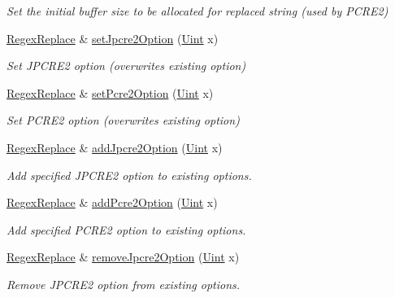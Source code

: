 \begin{DoxyCompactItemize}
\begin{DoxyCompactList}\small\item\em Set the initial buffer size to be allocated for replaced string (used by P\+C\+R\+E2) \end{DoxyCompactList}\item 
\hyperlink{classjpcre2_1_1RegexReplace}{Regex\+Replace} \& \hyperlink{classjpcre2_1_1RegexReplace_a745ab0b979035214a83ed0a04686ef6a}{set\+Jpcre2\+Option} (\hyperlink{namespacejpcre2_a078242d38221a13fb3543b9edd78c099}{Uint} x)
\begin{DoxyCompactList}\small\item\em Set J\+P\+C\+R\+E2 option (overwrites existing option) \end{DoxyCompactList}\item 
\hyperlink{classjpcre2_1_1RegexReplace}{Regex\+Replace} \& \hyperlink{classjpcre2_1_1RegexReplace_aec36272d351fdc3a8cb02a4a3efea5a2}{set\+Pcre2\+Option} (\hyperlink{namespacejpcre2_a078242d38221a13fb3543b9edd78c099}{Uint} x)
\begin{DoxyCompactList}\small\item\em Set P\+C\+R\+E2 option (overwrites existing option) \end{DoxyCompactList}\item 
\hyperlink{classjpcre2_1_1RegexReplace}{Regex\+Replace} \& \hyperlink{classjpcre2_1_1RegexReplace_a3f86b1e11d08d0153a08244771e59061}{add\+Jpcre2\+Option} (\hyperlink{namespacejpcre2_a078242d38221a13fb3543b9edd78c099}{Uint} x)
\begin{DoxyCompactList}\small\item\em Add specified J\+P\+C\+R\+E2 option to existing options. \end{DoxyCompactList}\item 
\hyperlink{classjpcre2_1_1RegexReplace}{Regex\+Replace} \& \hyperlink{classjpcre2_1_1RegexReplace_a3cfd03568b23bebcbb530a2c120b5d33}{add\+Pcre2\+Option} (\hyperlink{namespacejpcre2_a078242d38221a13fb3543b9edd78c099}{Uint} x)
\begin{DoxyCompactList}\small\item\em Add specified P\+C\+R\+E2 option to existing options. \end{DoxyCompactList}\item 
\hyperlink{classjpcre2_1_1RegexReplace}{Regex\+Replace} \& \hyperlink{classjpcre2_1_1RegexReplace_a6fbfd673dbb865e6248bc527ba45f2f7}{remove\+Jpcre2\+Option} (\hyperlink{namespacejpcre2_a078242d38221a13fb3543b9edd78c099}{Uint} x)
\begin{DoxyCompactList}\small\item\em Remove J\+P\+C\+R\+E2 option from existing options. \end{DoxyCompactList}\item 

\end{DoxyCompactItemize}
